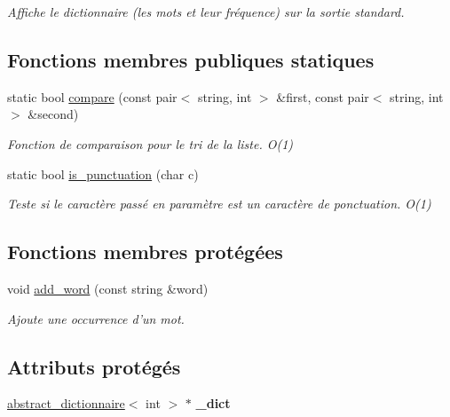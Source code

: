 \begin{DoxyCompactItemize}
\begin{DoxyCompactList}\small\item\em Affiche le dictionnaire (les mots et leur fréquence) sur la sortie standard. \end{DoxyCompactList}\end{DoxyCompactItemize}
\subsection*{Fonctions membres publiques statiques}
\begin{DoxyCompactItemize}
\item 
static bool \hyperlink{classparser__dictionnaire_a40771d9db792279e148df49edf1d7d26}{compare} (const pair$<$ string, int $>$ \&first, const pair$<$ string, int $>$ \&second)
\begin{DoxyCompactList}\small\item\em Fonction de comparaison pour le tri de la liste. O(1) \end{DoxyCompactList}\item 
static bool \hyperlink{classparser__dictionnaire_a33da85906d496ee71fb2c942e9f5b684}{is\-\_\-punctuation} (char c)
\begin{DoxyCompactList}\small\item\em Teste si le caractère passé en paramètre est un caractère de ponctuation. O(1) \end{DoxyCompactList}\end{DoxyCompactItemize}
\subsection*{Fonctions membres protégées}
\begin{DoxyCompactItemize}
\item 
void \hyperlink{classparser__dictionnaire_a4963828da3bb96c0728cf5d1579e6da7}{add\-\_\-word} (const string \&word)
\begin{DoxyCompactList}\small\item\em Ajoute une occurrence d'un mot. \end{DoxyCompactList}\end{DoxyCompactItemize}
\subsection*{Attributs protégés}
\begin{DoxyCompactItemize}
\item 
\hypertarget{classparser__dictionnaire_aa6b710fc3af553a09471d0029f655514}{\hyperlink{classabstract__dictionnaire}{abstract\-\_\-dictionnaire}$<$ int $>$ $\ast$ {\bfseries \-\_\-dict}}\label{classparser__dictionnaire_aa6b710fc3af553a09471d0029f655514}

\end{DoxyCompactItemize}


